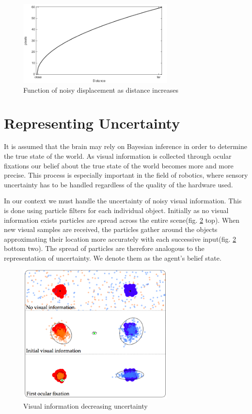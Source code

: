 \documentclass[11]{article}
\begin{document}
\begin{figure}[h]
	\centering
	\includegraphics[width=0.7\textwidth]{Noise.png}
	\caption{Function of noisy displacement as distance increases}
	\label{fig:noise}
\end{figure}
 
\section{Representing Uncertainty}
It is assumed that the brain may rely on Bayesian inference in order to determine the true state of the world. As visual information is collected through ocular fixations our belief about the true state of the world becomes more and more precise. This process is especially important in the field of robotics, where sensory uncertainty has to be handled regardless of the quality of the hardware used.  

In our context we must handle the uncertainty of noisy visual information. This is done using particle filters for each individual object. Initially as no visual information exists  particles are spread across the entire scene(fig. \ref{fig:uncertainty} top). When new visual samples are received, the particles gather around the objects approximating their location more accurately with each successive input(fig. \ref{fig:uncertainty} bottom two). The spread of particles are therefore analogous to the representation of uncertainty. We denote them as the agent's belief state. 

\begin{figure}[h]
	\centering
	\includegraphics[width=0.7\textwidth]{uncertainty.png}
	\caption{Visual information decreasing uncertainty}
	\label{fig:uncertainty}
\end{figure}
\end{document}
